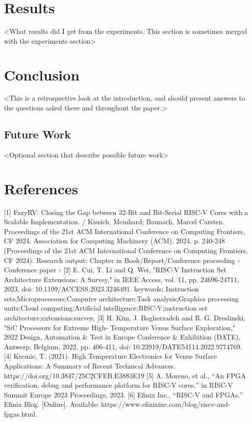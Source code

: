 \documentclass[10pt,twocolumn]{article}
\begin{document}
\section{Results}
<What results did I get from the experiments. This section is sometimes merged with the experiments section>

\section{Conclusion}
<This is a retrospective look at the introduction, and should present answers to the questions asked there and throughout the paper.>

\subsection{Future Work}
<Optional section that describe possible future work>

\section*{References}
[1] FazyRV: Closing the Gap between 32-Bit and Bit-Serial RISC-V Cores with a Scalable Implementation. / Kissich, Meinhard; Baunach, Marcel Carsten.
Proceedings of the 21st ACM International Conference on Computing Frontiers, CF 2024. Association for Computing Machinery (ACM), 2024. p. 240-248 (Proceedings of the 21st ACM International Conference on Computing Frontiers, CF 2024).
Research output: Chapter in Book/Report/Conference proceeding › Conference paper ›
[2] E. Cui, T. Li and Q. Wei, "RISC-V Instruction Set Architecture Extensions: A Survey," in IEEE Access, vol. 11, pp. 24696-24711, 2023, doi: 10.1109/ACCESS.2023.3246491.
keywords: {Instruction sets;Microprocessors;Computer architecture;Task analysis;Graphics processing units;Cloud computing;Artificial intelligence;RISC-V;instruction set architecture;extensions;survey},
[3] H. Kim, J. Bagherzadeh and R. G. Dreslinski, "SiC Processors for Extreme High- Temperature Venus Surface Exploration," 2022 Design, Automation & Test in Europe Conference & Exhibition (DATE), Antwerp, Belgium, 2022, pp. 406-411, doi: 10.23919/DATE54114.2022.9774769.
[4] Kremic, T. (2021). High Temperature Electronics for Venus Surface Applications: A Summary of Recent Technical Advances. https://doi.org/10.3847/25C2CFEB.E3883E19
[5] A. Moreno, et al., “An FPGA verification, debug and performance platform for RISC-V cores,” in RISC-V Summit Europe 2023 Proceedings, 2023. 
[6] Efinix Inc., “RISC-V and FPGAs,” Efinix Blog. [Online]. Available: https://www.efinixinc.com/blog/riscv-and-fpgas.html.
\end{document}
